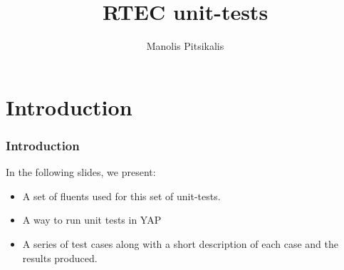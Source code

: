 \documentclass[8pt]{beamer}
\title[RTEC unit-tests]{RTEC unit-tests} %
\author{Manolis Pitsikalis} %
\newcounter{Table}
\begin{document}
\begin{frame}
    \titlepage %
\end{frame}



\section{Introduction} %
\begin{frame}
    \frametitle{Introduction}
    In the following slides, we present:
    \begin{itemize}
        \item A set of fluents used for this set of unit-tests.
        \item A way to run unit tests in YAP
        \item A series of test cases along
            with a short description of each case and the results produced.
    \end{itemize}
\end{frame}
\end{document}
